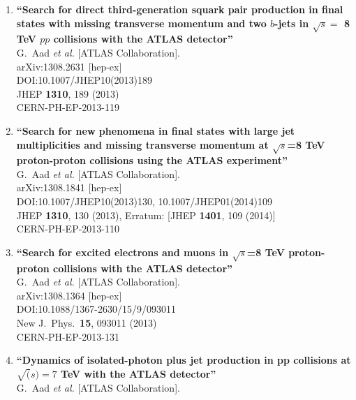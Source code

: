 \documentclass{article}
\begin{document}
\begin{enumerate}
\item%
{\bf ``Search for direct third-generation squark pair production in final states with missing transverse momentum and two $b$-jets in $\sqrt{s} =$ 8 TeV $pp$ collisions with the ATLAS detector''}
  \\{}G.~Aad {\it et al.} [ATLAS Collaboration].
  \\{}arXiv:1308.2631 [hep-ex]
  \\{}DOI:10.1007/JHEP10(2013)189
  \\{}JHEP {\bf 1310}, 189 (2013)
  \\{}CERN-PH-EP-2013-119
\item%
{\bf ``Search for new phenomena in final states with large jet multiplicities and missing transverse momentum at $\sqrt{s}$=8 TeV proton-proton collisions using the ATLAS experiment''}
  \\{}G.~Aad {\it et al.} [ATLAS Collaboration].
  \\{}arXiv:1308.1841 [hep-ex]
  \\{}DOI:10.1007/JHEP10(2013)130, 10.1007/JHEP01(2014)109
  \\{}JHEP {\bf 1310}, 130 (2013), Erratum: [JHEP {\bf 1401}, 109 (2014)]
  \\{}CERN-PH-EP-2013-110
\item%
{\bf ``Search for excited electrons and muons in $\sqrt{s}$=8 TeV proton-proton collisions with the ATLAS detector''}
  \\{}G.~Aad {\it et al.} [ATLAS Collaboration].
  \\{}arXiv:1308.1364 [hep-ex]
  \\{}DOI:10.1088/1367-2630/15/9/093011
  \\{}New J.\ Phys.\  {\bf 15}, 093011 (2013)
  \\{}CERN-PH-EP-2013-131
\item%
{\bf ``Dynamics of isolated-photon plus jet production in pp collisions at $\sqrt(s)=7$ TeV with the ATLAS detector''}
  \\{}G.~Aad {\it et al.} [ATLAS Collaboration].

\end{enumerate}
\end{document}
